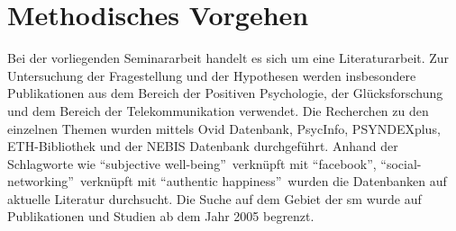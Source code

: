 \section{Methodisches Vorgehen}\label{sec.vorgehen}
Bei der vorliegenden Seminararbeit handelt es sich um eine Literaturarbeit. Zur Untersuchung der Fragestellung und der Hypothesen werden insbesondere Publikationen aus dem Bereich der Positiven Psychologie, der Glücksforschung und dem Bereich der Telekommunikation verwendet. Die Recherchen zu den einzelnen Themen wurden mittels Ovid Datenbank, PsycInfo, PSYNDEXplus, ETH-Bibliothek und der NEBIS Datenbank durchgeführt. Anhand der Schlagworte wie \textquotedblleft subjective well-being\textquotedblright \ verknüpft mit \textquotedblleft facebook\textquotedblright, \textquotedblleft social-networking\textquotedblright \ verknüpft mit \textquotedblleft authentic happiness\textquotedblright \ wurden die Datenbanken auf aktuelle Literatur durchsucht. Die Suche auf dem Gebiet der \gls{sm} wurde auf Publikationen und Studien ab dem Jahr 2005 begrenzt. 


